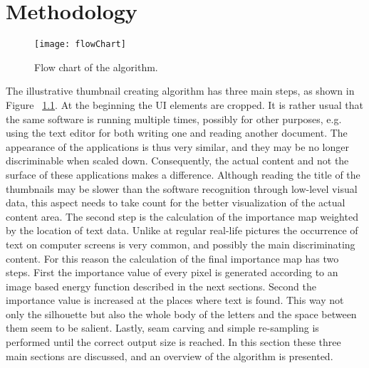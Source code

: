\documentclass[draft,final]{vutinfth} %
\begin{document}
	\chapter{Methodology}
	\begin{figure}
		\centering		
		\texttt{[image: flowChart]}
		\caption{Flow chart of the algorithm.}
		\label{fig:flowChart}
	\end{figure}
	The illustrative thumbnail creating algorithm has three main steps, as shown in Figure ~\ref{fig:flowChart}.
	At the beginning the UI elements are cropped.
	It is rather usual that the same software is running multiple times, possibly for other purposes, e.g. using the text editor for both writing one and reading another document.
	The appearance of the applications is thus very similar, and they may be no longer discriminable when scaled down.  
	Consequently, the actual content and not the surface of these applications makes a difference.
	Although reading the title of the thumbnails may be slower than the software recognition through low-level visual data, this aspect needs to take count for the better visualization of the actual content area.%
	The second step is the calculation of the importance map weighted by the location of text data.
	Unlike at regular real-life pictures the occurrence of text on computer screens is very common, and possibly the main discriminating content.
	For this reason the calculation of the final importance map has two steps.
	First the importance value of every pixel is generated according to an image based energy function described in the next sections.
	Second the importance value is increased at the places where text is found.
	This way not only the silhouette but also the whole body of the letters and the space between them seem to be salient.
	Lastly, seam carving and simple re-sampling is performed  until the correct output size is reached.
	In this section these three main sections are discussed, and an overview of the algorithm is presented.	
	
\end{document}
